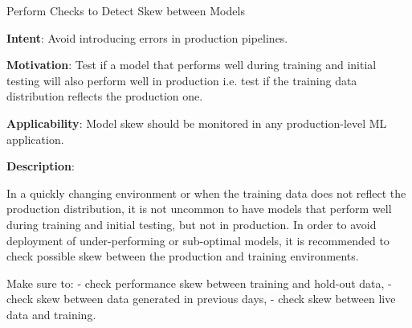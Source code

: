   
  \begin{frame}[plain]{ Perform Checks to Detect Skew between Models
 }

  \textbf{Intent}: Avoid introducing errors in production pipelines. 
 

  \textbf{Motivation}: Test if a model that performs well during training and initial testing will also perform well in production i.e. test if the training data distribution reflects the production one. 
 

  \textbf{Applicability}: Model skew should be monitored in any production-level ML application.
 

  \textbf{Description}: 

In a quickly changing environment or when the training data does not reflect the production distribution, it is not uncommon to have models that perform well during training and initial testing, but not in production.
In order to avoid deployment of under-performing or sub-optimal models, it is recommended to check possible skew between  the production and training environments.


Make sure to:
- check performance skew between training and hold-out data,
- check skew between data generated in previous days,
- check skew between live data and training.


 


  \end{frame}

